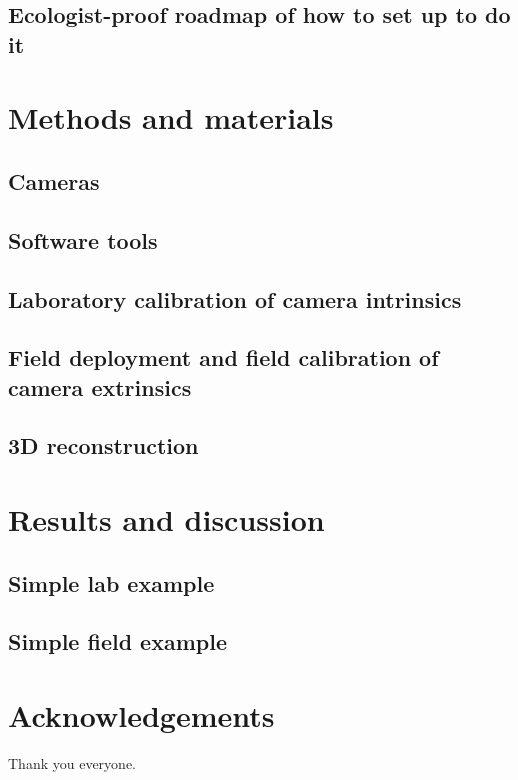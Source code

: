 \documentclass[fleqn,10pt]{wlpeerj}
\begin{document}
\subsection*{Ecologist-proof roadmap of how to set up to do it}

\section*{Methods and materials}
\subsection*{Cameras}
\subsection*{Software tools}
\subsection*{Laboratory calibration of camera intrinsics}
\subsection*{Field deployment and field calibration of camera extrinsics}
\subsection*{3D reconstruction}

\section*{Results and discussion}
\subsection*{Simple lab example}
\subsection*{Simple field example}

\section*{Acknowledgements}
Thank you everyone.


\end{document}
